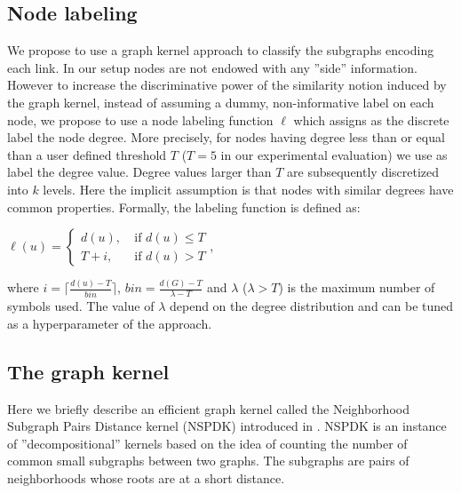 \documentclass[runningheads,a4paper]{llncs}
\begin{document}
\subsection{Node labeling}
We propose to use a graph kernel approach to classify the subgraphs encoding each link. In our setup nodes are not endowed with any ''side'' information. However to increase the discriminative power of the similarity notion induced by the graph kernel, instead of assuming a dummy, non-informative label on each node, we propose to use a node labeling function $\ell$ which assigns as the discrete label the node degree. More precisely, for nodes having degree less than or equal than a user defined threshold $T$ ($T=5$ in our experimental evaluation) we use as label the degree value. Degree values larger than $T$ are subsequently discretized into $k$ levels. Here the implicit assumption is that nodes with similar degrees have common properties. Formally, the labeling function is defined as:
\begin{center}
$\ell(u) = \left\{
	\begin{array}{ll}
		d(u),\  & \mbox{if } d(u) \leq T \\
		T+i,\ & \mbox{if } d(u) > T
	\end{array}
\right.$,
\end{center}
where $i = \lceil \frac{d(u)-T}{bin}\rceil$, $bin = \frac{d(G)-T}{\lambda - T}$ and $\lambda$ ($\lambda > T$) is the maximum number of symbols used. The value of $\lambda$ depend on the degree distribution and can be tuned as a hyperparameter of the approach.



\subsection{The graph kernel}
Here we briefly describe an efficient graph kernel called the Neighborhood Subgraph Pairs Distance kernel (NSPDK) introduced in \cite{nspdk}. NSPDK is an instance of ''decompositional'' kernels \cite{convolution-kernel} based on the idea of counting the number of common small subgraphs between two graphs. The subgraphs are pairs of neighborhoods whose roots are at a short distance. 
\end{document}
